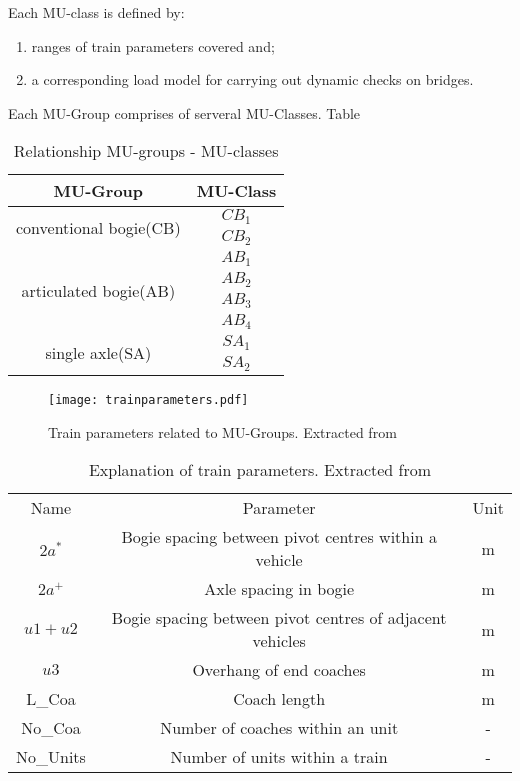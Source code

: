 \begin{appendices}
Each MU-class is defined by:

\begin{enumerate}[-]
\item ranges of train parameters covered and;
\item a corresponding load model for carrying out dynamic checks on bridges.
\end{enumerate}

Each MU-Group comprises of serveral MU-Classes. Table

\begin{table}[h]
    \centering
    \begin{tabular}{c|c}
        \hline
        MU-Group & MU-Class\\
        \hline
        \multirow{2}{*}{conventional bogie(CB)} & $CB_1$ \\
        & $CB_2$ \\
        \hline
        \multirow{4}{*}{articulated bogie(AB)} & $AB_1$ \\
        & $AB_2$ \\
        & $AB_3$ \\
        & $AB_4$ \\
        \hline
        \multirow{2}{*}{single axle(SA)} & $SA_1$ \\
        & $SA_2$ \\
        \hline
    \end{tabular}
    \caption{Relationship MU-groups - MU-classes}
    \label{tab:MU}
\end{table} 

\begin{figure}[h]
\centering
\texttt{[image: trainparameters.pdf]}
\caption{Train parameters related to MU-Groups. Extracted from \citet[Annex C]{EC15528}}
\label{fig:trainparameters}
\end{figure}

\begin{table}[h]
    \centering
    \begin{tabular}{c|c|c}
    \hline
    Name & Parameter & Unit \\
    $2a^*$ & Bogie spacing between pivot centres within a vehicle & m \\
    $2a^+$ & Axle spacing in bogie & m \\
    $u1+u2$ & Bogie spacing between pivot centres of adjacent vehicles & m \\
    $u3$ & Overhang of end coaches & m \\
    L\_Coa & Coach length & m \\
    No\_Coa & Number of coaches within an unit & - \\
    No\_Units & Number of units within a train & - \\
    \hline
    \end{tabular}
    \caption{Explanation of train parameters. Extracted from \citet[Annex C]{EC15528}}
    \label{tab:explanationtrainparameters}
\end{table}


\end{appendices}
